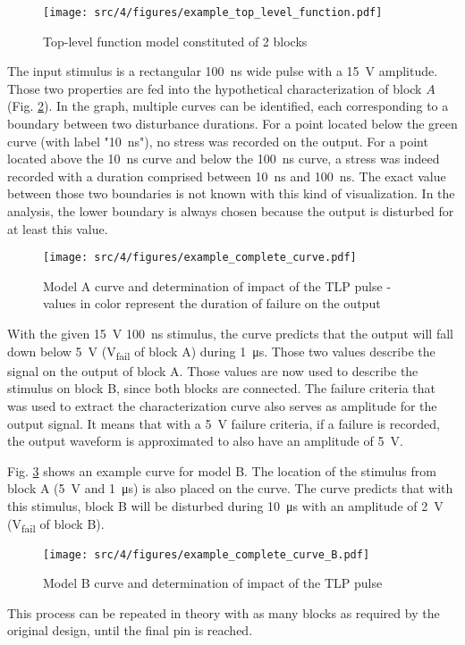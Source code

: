 \begin{figure}[!h]
  \centering
  \texttt{[image: src/4/figures/example\_top\_level\_function.pdf]}
  \caption{Top-level function model constituted of 2 blocks}
  \label{example_toplevel_function}
\end{figure}

The input stimulus is a rectangular \SI{100}{\nano\second} wide pulse with a \SI{15}{\volt} amplitude.
Those two properties are fed into the hypothetical characterization of block $A$ (Fig. \ref{example_complete_curve}).
In the graph, multiple curves can be identified, each corresponding to a boundary between two disturbance durations.
For a point located below the green curve (with label "\SI{10}{\nano\second}"), no stress was recorded on the output.
For a point located above the \SI{10}{\nano\second} curve and below the \SI{100}{\nano\second} curve, a stress was indeed recorded with a duration comprised between \SI{10}{\nano\second} and \SI{100}{\nano\second}.
The exact value between those two boundaries is not known with this kind of visualization.
In the analysis, the lower boundary is always chosen because the output is disturbed for at least this value.

\begin{figure}[!h]
  \centering
  \texttt{[image: src/4/figures/example\_complete\_curve.pdf]}
  \caption{Model A curve and determination of impact of the TLP pulse - values in color represent the duration of failure on the output}
  \label{example_complete_curve}
\end{figure}

With the given \SI{15}{\volt} \SI{100}{\nano\second} stimulus, the curve predicts that the output will fall down below \SI{5}{\volt} (V\textsubscript{fail} of block A) during \SI{1}{\micro\second}.
Those two values describe the signal on the output of block A.
Those values are now used to describe the stimulus on block B, since both blocks are connected.
The failure criteria that was used to extract the characterization curve also serves as amplitude for the output signal.
It means that with a \SI{5}{\volt} failure criteria, if a failure is recorded, the output waveform is approximated to also have an amplitude of \SI{5}{\volt}.

Fig. \ref{example_complete_curve_B} shows an example curve for model B.
The location of the stimulus from block A (\SI{5}{\volt} and \SI{1}{\micro\second}) is also placed on the curve.
The curve predicts that with this stimulus, block B will be disturbed during \SI{10}{\micro\second} with an amplitude of \SI{2}{\volt} (V\textsubscript{fail} of block B).

\begin{figure}[!h]
  \centering
  \texttt{[image: src/4/figures/example\_complete\_curve\_B.pdf]}
  \caption{Model B curve and determination of impact of the TLP pulse}
  \label{example_complete_curve_B}
\end{figure}

This process can be repeated in theory with as many blocks as required by the original design, until the final pin is reached.
